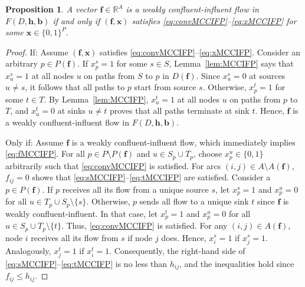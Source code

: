 \documentclass[pdflatex,sn-mathphys-num]{sn-jnl}%
\theoremstyle{thmstyleone}%
\newtheorem{proposition}[theorem]{Proposition}%
\begin{document}
\begin{proposition} \label{prop:MCCIFP}
A vector $\boldsymbol{f}\in\mathbb{R}^A$ is a weakly confluent-influent flow in $F(D,\boldsymbol{h},\boldsymbol{b})$ if and only if
$(\boldsymbol{f},\boldsymbol{x})$ satisfies \eqref{eq:convMCCIFP}--\eqref{eq:xMCCIFP} for some $\boldsymbol{x}\in\{0,1\}^P$.
\end{proposition}
\begin{proof}
If: Assume $(\boldsymbol{f},\boldsymbol{x})$ satisfies \eqref{eq:convMCCIFP}--\eqref{eq:xMCCIFP}.
Consider an arbitrary $p\in P(\boldsymbol{f})$.
If $x_p^s=1$ for some $s\in S$, Lemma~\ref{lem:MCCIFP} says that $x_u^s=1$ at all nodes $u$ on paths from $S$ to $p$ in $D(\boldsymbol{f})$.
Since $x_u^s=0$ at sources $u\neq s$, it follows that all paths to $p$ start from source $s$.
Otherwise, $x_p^t=1$ for some $t\in T$. By Lemma~\ref{lem:MCCIFP}, $x_u^t=1$ at all nodes $u$ on paths from $p$ to $T$, and $x_u^t=0$ at sinks $u\neq t$ proves that all paths terminate at sink $t$.
Hence, $\boldsymbol{f}$ is a weakly confluent-influent flow in $F(D,\boldsymbol{h},\boldsymbol{b})$.

Only if: Assume $\boldsymbol{f}$ is a weakly confluent-influent flow, which immediately implies \eqref{eq:fMCCIFP}.
For all $p\in P\setminus P(\boldsymbol{f})$ and $u\in S_p\cup T_p$, choose $x_p^u\in\{0,1\}$ arbitrarily such that \eqref{eq:convMCCIFP} is satisfied.
For arcs $(i,j)\in A\setminus A(\boldsymbol{f})$, $f_{ij}=0$ shows that \eqref{eq:sMCCIFP}--\eqref{eq:tMCCIFP} are satisfied.
Consider a $p\in P(\boldsymbol{f})$. If $p$ receives all its flow from a unique source $s$, let $x_p^s=1$ and $x_p^u=0$ for all $u\in T_p\cup S_p\setminus\{s\}$.
Otherwise, $p$ sends all flow to a unique sink $t$ since $\boldsymbol{f}$ is weakly confluent-influent.
In that case, let $x_p^t=1$ and $x_p^u=0$ for all $u\in S_p\cup T_p\setminus\{t\}$. Thus, \eqref{eq:convMCCIFP} is satisfied.
For any $(i,j)\in A(\boldsymbol{f})$, node $i$ receives all its flow from $s$ if node $j$ does.
Hence, $x_i^s=1$ if $x_j^s=1$. Analogously, $x_j^t=1$ if $x_i^t=1$.
Consequently, the right-hand side of \eqref{eq:sMCCIFP}--\eqref{eq:tMCCIFP} is no less than $h_{ij}$,
and the inequalities hold since $f_{ij}\leq h_{ij}$.
\end{proof}
\end{document}
